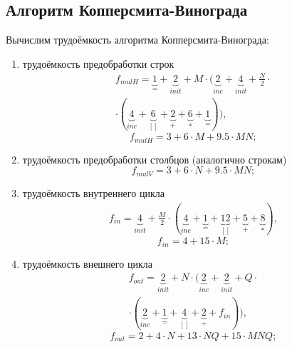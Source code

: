 \subsection{Алгоритм Копперсмита-Винограда}

Вычислим трудоёмкость алгоритма Копперсмита-Винограда:
\begin{enumerate}
	\item трудоёмкость предобработки строк
	\begin{equation}
	\begin{gathered}
		f_{mulH} = \underbrace{1}_{=} + \underbrace{2}_{init} + M \cdot (\underbrace{2}_{inc} + \underbrace{4}_{init} + \frac{N}{2} \cdot \\
		\cdot (\underbrace{4}_{inc} + \underbrace{6}_{[]} + \underbrace{2}_{+} +\underbrace{6}_{*} + \underbrace{1}_{=})),
	\end{gathered}
	\end{equation}
	\begin{equation}
			f_{mulH} = 3 + 6 \cdot M + 9.5 \cdot MN;
	\end{equation}
	
	\item трудоёмкость предобработки столбцов (аналогично строкам)
	\begin{equation}
		f_{mulV} = 3 + 6 \cdot N + 9.5 \cdot MN;
	\end{equation}
	
	\item трудоёмкость внутреннего цикла
	\begin{equation}
	\begin{gathered}
		f_{in} = \underbrace{4}_{init} + \frac{M}{2} \cdot (\underbrace{4}_{inc} + \underbrace{1}_{=} + \underbrace{12}_{[]} + \underbrace{5}_{+} + \underbrace{8}_{*}),
	\end{gathered}
	\end{equation}
	\begin{equation}
		f_{in} = 4 + 15 \cdot M;
	\end{equation}
	
	\item трудоёмкость внешнего цикла
	\begin{equation}
		\begin{gathered}
			f_{out} = \underbrace{2}_{init} + N \cdot (\underbrace{2}_{inc} + \underbrace{2}_{init} + Q \cdot \\ 
			\cdot (\underbrace{2}_{inc} + \underbrace{1}_{=} + \underbrace{4}_{[]} + \underbrace{2}_{+} + f_{in})),
		\end{gathered}
	\end{equation}
	\begin{equation}
		f_{out} = 2 + 4 \cdot N + 13 \cdot NQ + 15 \cdot MNQ;
	\end{equation}


\end{enumerate}
